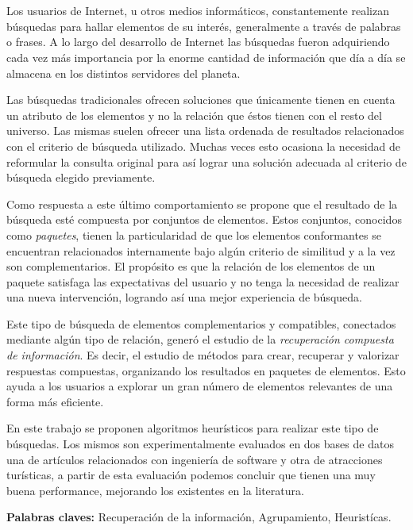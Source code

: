\chapter*{\runtitulo}

\noindent 

Los usuarios de Internet, u otros medios informáticos, constantemente realizan búsquedas para hallar elementos de su interés, generalmente a través de palabras o frases. A lo largo del desarrollo de Internet las búsquedas fueron adquiriendo cada vez más importancia por la enorme cantidad de información que día a día se almacena en los distintos servidores del planeta.

Las búsquedas tradicionales ofrecen soluciones que únicamente tienen en cuenta un atributo de los elementos y no la relación que éstos tienen con el resto del universo. Las mismas suelen ofrecer una lista ordenada de resultados relacionados con el criterio de búsqueda utilizado. Muchas veces esto ocasiona la necesidad de reformular la consulta original para así lograr una solución adecuada al criterio de búsqueda elegido previamente.

Como respuesta a este último comportamiento se propone que el resultado de la búsqueda esté compuesta por conjuntos de elementos. Estos conjuntos, conocidos como {\em paquetes}, tienen la particularidad de que los elementos conformantes se encuentran relacionados internamente bajo algún criterio de similitud y a la vez son complementarios. El propósito es que la relación de los elementos de un paquete satisfaga las expectativas del usuario y no tenga la necesidad de realizar una nueva intervención, logrando así una mejor experiencia de búsqueda.

Este tipo de búsqueda de elementos complementarios y compatibles, conectados mediante algún tipo de relación, generó el estudio de la {\em recuperación compuesta de información}. Es decir, el estudio de métodos para crear, recuperar y valorizar respuestas compuestas, organizando los resultados en paquetes de elementos. Esto ayuda a los usuarios a explorar un gran número de elementos relevantes de una forma más eficiente.

En este trabajo se proponen algoritmos heurísticos para realizar este tipo de búsquedas. Los mismos son experimentalmente evaluados en dos bases de datos una de artículos relacionados con ingeniería de software y otra de atracciones turísticas, a partir de esta evaluación podemos concluir que tienen una muy buena performance, mejorando los existentes en la literatura.
\bigskip


\noindent\textbf{Palabras claves:} Recuperación de la información, Agrupamiento, Heuristícas.